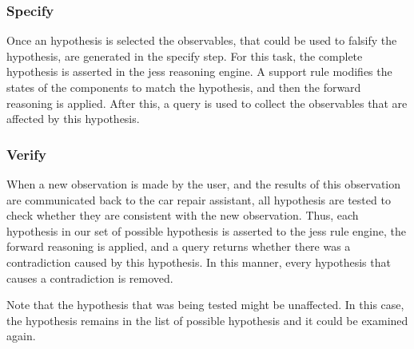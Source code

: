 \subsubsection{Specify}
Once an hypothesis is selected the observables, that could be used to falsify the hypothesis, are generated in the specify step. For this task, the complete hypothesis is asserted in the jess reasoning engine. A support rule modifies the states of the components to match the hypothesis, and then the forward reasoning is applied. After this, a query is used to collect the observables that are affected by this hypothesis.

\subsubsection{Verify}
When a new observation is made by the user, and the results of this observation are communicated back to the car repair assistant, all hypothesis are tested to check whether they are consistent with the new observation. Thus, each hypothesis in our set of possible hypothesis is asserted to the jess rule engine, the forward reasoning is applied, and a query returns whether there was a contradiction caused by this hypothesis. In this manner, every hypothesis that causes a contradiction is removed.

Note that the hypothesis that was being tested might be unaffected. In this case, the hypothesis remains in the list of possible hypothesis and it could be examined again.


